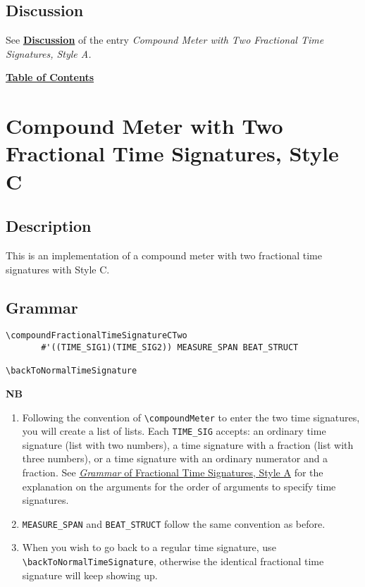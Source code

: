 \subsection{Discussion}
See \hyperref[sec:compoundfractionalmeter_discussion]{\textbf{Discussion}} of the entry \textit{Compound Meter with Two Fractional Time Signatures, Style A.} \par
\hyperref[sec:toc]{\textbf{Table of Contents}}

\vfill \break




\section {Compound Meter with Two Fractional Time Signatures, Style C}

\hfill
{}
\hfill

\subsection{Description}
This is an implementation of a compound meter with two fractional time signatures with Style C.  

\subsection{Grammar}
\begin{verbatim}
\compoundFractionalTimeSignatureCTwo 
       #'((TIME_SIG1)(TIME_SIG2)) MEASURE_SPAN BEAT_STRUCT

\backToNormalTimeSignature

\end{verbatim}
\textbf{NB} 
\begin{enumerate}
\item Following the convention of \verb|\compoundMeter| to enter the two time signatures, you will create a list of lists. Each \verb|TIME_SIG| accepts: an ordinary time signature (list with two numbers), a time signature with a fraction (list with three numbers), or a time signature with an ordinary numerator and a fraction. See \hyperref[sec:time_signatures_styleA_convention]{\textit{Grammar} of Fractional Time Signatures, Style A} for the explanation on the arguments for the order of arguments to specify time signatures.
\item \verb|MEASURE_SPAN| and \verb|BEAT_STRUCT| follow the same convention as before.
\item When you wish to go back to a regular time signature, use \verb|\backToNormalTimeSignature|, otherwise the identical fractional time signature will keep showing up.
\end{enumerate}
